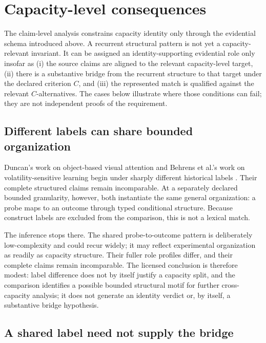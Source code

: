 \documentclass[11pt]{article}
\begin{document}
\section{Capacity-level consequences}

The claim-level analysis constrains capacity identity only through the evidential schema introduced above. A recurrent structural pattern is not yet a capacity-relevant invariant. It can be assigned an identity-supporting evidential role only insofar as (i) the source claims are aligned to the relevant capacity-level target, (ii) there is a substantive bridge from the recurrent structure to that target under the declared criterion \(C\), and (iii) the represented match is qualified against the relevant \(C\)-alternatives. The cases below illustrate where those conditions can fail; they are not independent proofs of the requirement.


\subsection{Different labels can share bounded organization}

Duncan's work on object-based visual attention and Behrens et al.'s work on volatility-sensitive learning begin under sharply different historical labels \citep{Duncan1984SelectiveAttention,BehrensEtAl2007ValueInformation}. Their complete structured claims remain incomparable. At a separately declared bounded granularity, however, both instantiate the same general organization: a probe maps to an outcome through typed conditional structure. Because construct labels are excluded from the comparison, this is not a lexical match.

The inference stops there. The shared probe-to-outcome pattern is deliberately low-complexity and could recur widely; it may reflect experimental organization as readily as capacity structure. Their fuller role profiles differ, and their complete claims remain incomparable. The licensed conclusion is therefore modest: label difference does not by itself justify a capacity split, and the comparison identifies a possible bounded structural motif for further cross-capacity analysis; it does not generate an identity verdict or, by itself, a substantive bridge hypothesis.

\subsection{A shared label need not supply the bridge}
\end{document}
